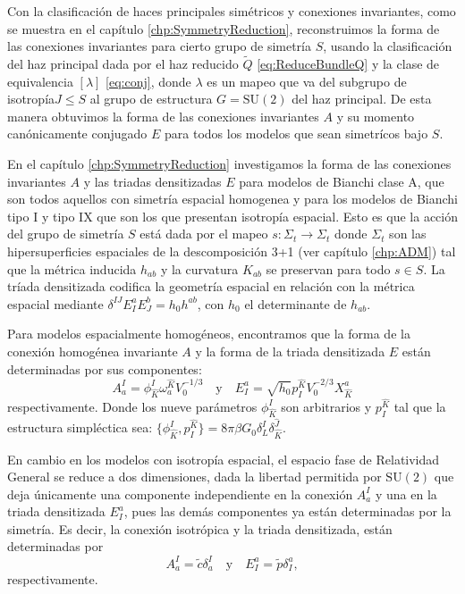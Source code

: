 Con la clasificaci\'{o}n de haces principales sim\'{e}tricos y conexiones invariantes, como se muestra en el cap\'{i}tulo \ref{chp:SymmetryReduction}, reconstruimos la forma de las conexiones invariantes para cierto grupo de simetr\'{i}a $S$, usando la clasificaci\'{o}n del haz principal dada por el haz reducido $\tilde{Q}$ \eqref{eq:ReduceBundleQ} y la clase de equivalencia $[\lambda]$ \eqref{eq:conj}, donde $\lambda$ es un mapeo que va del subgrupo de isotrop\'{i}a\footnotemark $J \leq S$ al grupo de estructura $G = \mathrm{SU}(2)$ del haz principal. De esta manera obtuvimos la forma de las conexiones invariantes $A$ y su momento can\'{o}nicamente conjugado $E$ para todos los modelos que sean simetr\'{i}cos bajo $S$.

En el cap\'{i}tulo \ref{chp:SymmetryReduction} investigamos la forma de las conexiones invariantes $A$ y las triadas densitizadas $E$ para modelos de Bianchi clase A, que son todos aquellos con simetr\'{i}a espacial homogenea y para los modelos de Bianchi tipo I y tipo IX que son los que presentan isotrop\'{i}a espacial. Esto es que la acci\'{o}n del grupo de simetr\'{i}a $S$ est\'{a} dada por el mapeo $s: \Sigma_{t} \longrightarrow \Sigma_{t}$ donde $\Sigma_{t}$ son las hipersuperficies espaciales de la descomposici\'{o}n 3+1 (ver cap\'{i}tulo \ref{chp:ADM}) tal que la m\'{e}trica inducida $h_{ab}$ y la curvatura $K_{ab}$ se preservan para todo $s \in S$. La tr\'{i}ada densitizada codifica la geometr\'{i}a espacial en relaci\'{o}n con la m\'{e}trica espacial mediante $\delta^{IJ} E^{a}_{I} E^{b}_{J} = h_{0} h^{ab}$, con $h_{0}$ el determinante de $h_{ab}$.

Para modelos espacialmente homog\'{e}neos, encontramos que la forma de la conexi\'{o}n homog\'{e}nea invariante $A$ y la forma de la triada densitizada $E$ est\'{a}n determinadas por sus componentes:
%
\begin{equation*}
A^{I}_{a} = \phi^{I}_{\hat{K}} \omega^{\hat{K}}_{a} V^{-1/3}_{0} \quad \mathrm{y} \quad E^{a}_{I} = \sqrt{h_{0}} p^{\hat{K}}_{I} V^{-2/3}_{0} X^{a}_{\hat{K}}
\end{equation*}
%
respectivamente. Donde los nueve par\'{a}metros $\phi^{I}_{\hat{K}}$ son arbitrarios y $p^{\hat{K}}_{I}$ tal que la estructura simpl\'{e}ctica sea: $\{\phi^{I}_{\hat{K}}, p^{\hat{K}}_{I}\} = 8 \pi \beta G_{0} \delta^{I}_{L} \delta^{\hat{J}}_{\hat{K}}$.

En cambio en los modelos con isotrop\'{i}a espacial, el espacio fase de Relatividad General se reduce a dos dimensiones, dada la libertad permitida por $\mathrm{SU}(2)$ que deja \'{u}nicamente una componente independiente en la conexi\'{o}n $A^{I}_{a}$ y una en la triada densitizada $E^{a}_{I}$, pues las dem\'{a}s componentes ya est\'{a}n determinadas por la simetr\'{i}a. Es decir, la conexi\'{o}n isotr\'{o}pica y la triada densitizada, est\'{a}n determinadas por
%
\begin{equation*}
A^{I}_{a} = \tilde{c} \delta^{I}_{a} \quad \mathrm{y} \quad E^{a}_{I} = \tilde{p} \delta^{a}_{I},
\end{equation*}
%
respectivamente.

